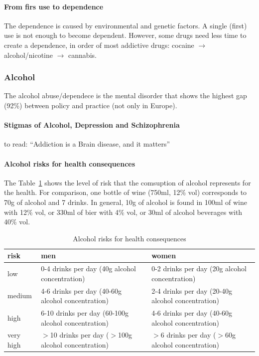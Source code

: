\documentclass[12pt,article,oneside,a4paper]{memoir}
\begin{document}
\paragraph{From firs use to dependence} 
The dependence is caused by environmental and genetic factors. A single (first) use is not enough to become dependent.
However, some drugs need less time to create a dependence, in order of most addictive drugs: cocaine $\rightarrow$ alcohol/nicotine $\rightarrow$ cannabis.

\subsubsection{Alcohol}

The alcohol abuse/dependece is the mental disorder that shows the highest gap (92\%) between policy and practice (not only in Europe).

\paragraph{Stigmas of Alcohol, Depression and Schizophrenia}
 to read: ``Addiction is a Brain disease, and it matters''

\paragraph{Alcohol risks for health consequences} 

The Table~\ref{table:alcohol-risks} shows the level of risk that the comsuption of alcohol represents for the health. For comparison, one bottle of wine (750ml, 12\% vol) corresponds to 70g of alcohol and 7 drinks. In general, 10g of alcohol is found in 100ml of wine with 12\% vol, or 330ml of bier with 4\% vol, or 30ml of alcohol beverages with 40\% vol.

\begin{table}
  \begin{tabular}{ p{4cm} | p{5cm} | p{5cm} }
    \hline
    risk & men & women \\ \hline
	\hline
    low & 0-4 drinks per day (40g alcohol concentration) & 0-2 drinks per day (20g alcohol concentration) \\ \hline
    medium & 4-6 drinks per day (40-60g alcohol concentration) & 2-4 drinks per day (20-40g alcohol concentration) \\ \hline
    high & 6-10 drinks per day (60-100g alcohol concentration) & 4-6 drinks per day (40-60g alcohol concentration) \\ \hline
    very high & $>$10 drinks per day ($>$100g alcohol concentration) & $>$6 drinks per day ($>$60g alcohol concentration) \\ 
    \hline
  \end{tabular}
  \caption{Alcohol risks for health consequences}
  \label{table:alcohol-risks}
\end{table}
\end{document}
